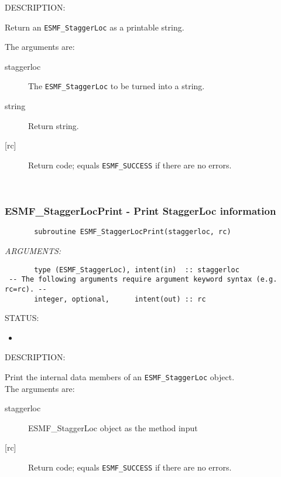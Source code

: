 {\sf DESCRIPTION:\\ }


       Return an {\tt ESMF\_StaggerLoc} as a printable string.
  
       The arguments are:
       \begin{description}
       \item [staggerloc]
             The {\tt ESMF\_StaggerLoc} to be turned into a string.
       \item [string]
            Return string.
       \item [{[rc]}]
             Return code; equals {\tt ESMF\_SUCCESS} if there are no errors.
       \end{description}
  
   
 
\mbox{}\hrulefill\ 
 
\subsubsection [ESMF\_StaggerLocPrint] {ESMF\_StaggerLocPrint - Print StaggerLoc information}


 
\begin{verbatim}       subroutine ESMF_StaggerLocPrint(staggerloc, rc)\end{verbatim}{\em ARGUMENTS:}
\begin{verbatim}       type (ESMF_StaggerLoc), intent(in)  :: staggerloc
 -- The following arguments require argument keyword syntax (e.g. rc=rc). --
       integer, optional,      intent(out) :: rc 
 \end{verbatim}
{\sf STATUS:}
   \begin{itemize}
   \item{}
   \end{itemize}
  
{\sf DESCRIPTION:\\ }


       Print the internal data members of an {\tt ESMF\_StaggerLoc} object. \\
  
       The arguments are:
       \begin{description}
       \item[staggerloc]
            ESMF\_StaggerLoc object as the method input
       \item[{[rc]}]
            Return code; equals {\tt ESMF\_SUCCESS} if there are no errors.
     \end{description}
  
\setlength{\parskip}{\oldparskip}
\setlength{\parindent}{\oldparindent}
\setlength{\baselineskip}{\oldbaselineskip}
